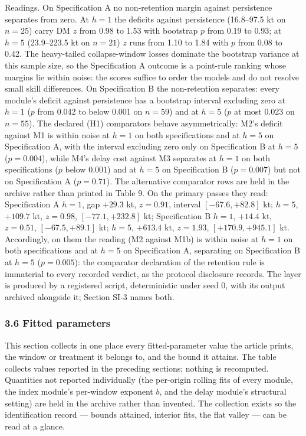 \documentclass[11pt]{article}
\begin{document}
Readings. On Specification A no non-retention margin against persistence separates
from zero. At \(h=1\) the deficits against persistence (16.8--97.5 kt
on \(n=25\)) carry DM \(z\) from 0.98 to 1.53 with bootstrap \(p\) from
0.19 to 0.93; at \(h=5\) (23.9--223.5 kt on \(n=21\)) \(z\) runs from
1.10 to 1.84 with \(p\) from 0.08 to 0.42. The heavy-tailed
collapse-window losses dominate the bootstrap variance at this sample
size, so the Specification A outcome is a point-rule ranking whose
margins lie within noise: the scores suffice to order the models and do
not resolve small skill differences. On Specification B the non-retention
separates: every module's deficit against persistence has a bootstrap interval excluding zero at
\(h=1\) (\(p\) from 0.042 to below 0.001 on \(n=59\)) and at \(h=5\)
(\(p\) at most 0.023 on \(n=55\)). The declared (H1) comparators behave
asymmetrically: M2's deficit against M1 is within noise at \(h=1\) on
both specifications and at \(h=5\) on Specification A, with the interval excluding zero only
on Specification B at \(h=5\) (\(p=0.004\)), while M4's delay cost
against M3 separates at \(h=1\) on both specifications (\(p\) below
0.001) and at \(h=5\) on Specification B (\(p=0.007\)) but not on
Specification A (\(p=0.71\)). The alternative comparator rows are held in the archive rather than
printed in Table 9. On the primary passes they read: Specification A
\(h=1\), gap \(+29.3\) kt, \(z=0.91\), interval
\([-67.6, +82.8]\) kt; \(h=5\), \(+109.7\) kt, \(z=0.98\),
\([-77.1, +232.8]\) kt; Specification B \(h=1\), \(+14.4\) kt,
\(z=0.51\), \([-67.5, +89.1]\) kt; \(h=5\), \(+613.4\) kt,
\(z=1.93\), \([+170.9, +945.1]\) kt. Accordingly, on them the reading (M2
against M1b) is within noise at \(h=1\) on both specifications and at
\(h=5\) on Specification A, separating on Specification B at \(h=5\)
(\(p=0.005\)): the comparator declaration of the retention rule is
immaterial to every recorded verdict, as the protocol disclosure
records. The layer is produced by a registered script, deterministic under seed 0,
with its output archived alongside it; Section SI-3 names both.

\subsubsection{3.6 Fitted parameters}\label{cod-fitted-parameters}

This section collects in one place every fitted-parameter value the
article prints, the window or treatment it belongs to, and the bound it
attains. The table collects values reported in the preceding
sections; nothing is recomputed. Quantities not reported individually
(the per-origin rolling fits of every module, the index module's
per-window exponent \(b\), and the delay module's structural setting)
are held in the archive rather than
invented. The collection exists so the identification record --- bounds
attained, interior fits, the flat valley --- can be read at a glance.
\end{document}
